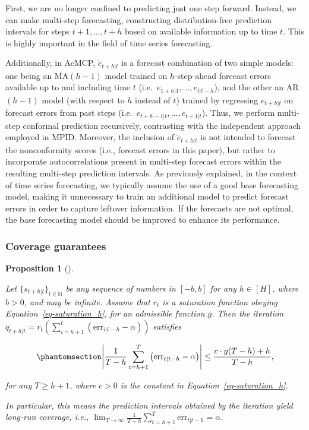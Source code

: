 \documentclass[
  11pt,
  a4paper,
]{article}
\theoremstyle{plain}
\newtheorem{proposition}{Proposition}[section]
\theoremstyle{plain}
\theoremstyle{remark}
\begin{document}
First, we are no longer confined to predicting just one step forward.
Instead, we can make multi-step forecasting, constructing
distribution-free prediction intervals for steps \(t+1,\ldots,t+h\)
based on available information up to time \(t\). This is highly
important in the field of time series forecasting.

Additionally, in AcMCP, \(\tilde{e}_{t+h|t}\) is a forecast combination
of two simple models: one being an MA\((h-1)\) model trained on
\(h\)-step-ahead forecast errors available up to and including time
\(t\) (i.e.~\(e_{1+h|1}, \ldots, e_{t|t-h}\)), and the other an
AR\((h-1)\) model (with respect to \(h\) instead of \(t\)) trained by
regressing \(e_{t+h|t}\) on forecast errors from past steps
(i.e.~\(e_{t+h-1|t}, \ldots, e_{t+1|t}\)). Thus, we perform multi-step
conformal prediction recursively, contrasting with the independent
approach employed in MPID. Moreover, the inclusion of
\(\tilde{e}_{t+h|t}\) is not intended to forecast the nonconformity
scores (i.e., forecast errors in this paper), but rather to incorporate
autocorrelations present in multi-step forecast errors within the
resulting multi-step prediction intervals. As previously explained, in
the context of time series forecasting, we typically assume the use of a
good base forecasting model, making it unnecessary to train an
additional model to predict forecast errors in order to capture leftover
information. If the forecasts are not optimal, the base forecasting
model should be improved to enhance its performance.

\subsubsection{Coverage guarantees}\label{coverage-guarantees}

\begin{proposition}[]\protect\hypertarget{prp-cov_rt}{}\label{prp-cov_rt}

Let \(\{s_{t+h|t}\}_{t\in\mathbb{N}}\) be any sequence of numbers in
\([-b, b]\) for any \(h\in[H]\), where \(b>0\), and may be infinite.
Assume that \(r_t\) is a saturation function obeying
Equation~\ref{eq-saturation_h}, for an admissible function \(g\). Then
the iteration
\(q_{t+h|t}=r_t\left(\sum_{i=h+1}^t\left(\mathrm{err}_{i|i-h}-\alpha\right)\right)\)
satisfies

\begin{equation}\phantomsection\label{eq-cov_rt}{
\left|\frac{1}{T-h}\sum_{t=h+1}^{T}\left(\mathrm{err}_{t|t-h}-\alpha\right)\right| \leq \frac{c \cdot g(T-h) + h}{T-h},
}\end{equation}

for any \(T \geq h+1\), where \(c>0\) is the constant in
Equation~\ref{eq-saturation_h}.

In particular, this means the prediction intervals obtained by the
iteration yield long-run coverage, i.e.,
\(\lim _{T \rightarrow \infty} \frac{1}{T-h} \sum_{t=h+1}^T \mathrm{err}_{t|t-h} = \alpha\).

\end{proposition}
\end{document}
